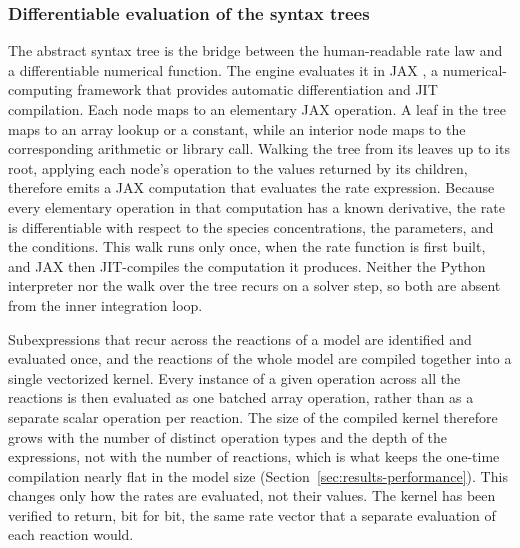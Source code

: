 \documentclass{article}
\begin{document}
\subsubsection{Differentiable evaluation of the syntax trees}
\label{sec:methods-eval}

The abstract syntax tree is the bridge between the human-readable rate law and a differentiable numerical function. The engine evaluates it in JAX \citep{jax2018github}, a numerical-computing framework that provides automatic differentiation and JIT compilation. Each node maps to an elementary JAX operation. A leaf in the tree maps to an array lookup or a constant, while an interior node maps to the corresponding arithmetic or library call. Walking the tree from its leaves up to its root, applying each node's operation to the values returned by its children, therefore emits a JAX computation that evaluates the rate expression. Because every elementary operation in that computation has a known derivative, the rate is differentiable with respect to the species concentrations, the parameters, and the conditions. This walk runs only once, when the rate function is first built, and JAX then JIT-compiles the computation it produces. Neither the Python interpreter nor the walk over the tree recurs on a solver step, so both are absent from the inner integration loop. 

Subexpressions that recur across the reactions of a model are identified and evaluated once, and the reactions of the whole model are compiled together into a single vectorized kernel. Every instance of a given operation across all the reactions is then evaluated as one batched array operation, rather than as a separate scalar operation per reaction. The size of the compiled kernel therefore grows with the number of distinct operation types and the depth of the expressions, not with the number of reactions, which is what keeps the one-time compilation nearly flat in the model size (Section~\ref{sec:results-performance}). This changes only how the rates are evaluated, not their values. The kernel has been verified to return, bit for bit, the same rate vector that a separate evaluation of each reaction would.
\end{document}
